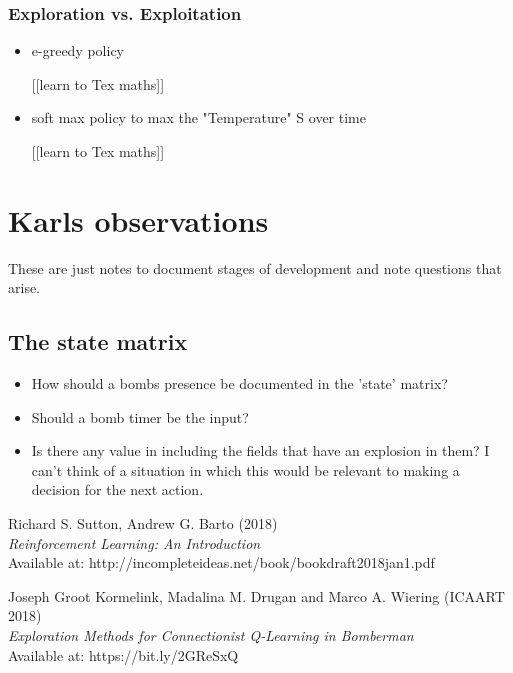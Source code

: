 \documentclass[12pt]{report}
\begin{document}
\subsubsection{Exploration vs. Exploitation}
\begin{itemize}
	\item e-greedy policy 
	
	[[learn to Tex maths]]
	\item soft max policy to max the "Temperature" S over time
	
	[[learn to Tex maths]]
\end{itemize}


\section{Karls observations}

These are just notes to document stages of development and note questions that arise.
\subsection{The state matrix}
\begin{itemize}
	\item How should a bombs presence be documented in the 'state' matrix? 
	\item Should a bomb timer be the input?
	\item Is there any value in including the fields that have an explosion in them? 
	I can't think of a situation in which this would be relevant to making a decision for the next action.
\end{itemize}

\begin{thebibliography}{111}
   



Richard S. Sutton, Andrew G. Barto (2018)\\
\textit{Reinforcement Learning: An Introduction}\\
Available at: http://incompleteideas.net/book/bookdraft2018jan1.pdf

Joseph Groot Kormelink, Madalina M. Drugan and Marco A. Wiering (ICAART 2018)\\
\textit{Exploration Methods for Connectionist Q-Learning in Bomberman}\\
Available at: https://bit.ly/2GReSxQ
\end{thebibliography}
\end{document}

